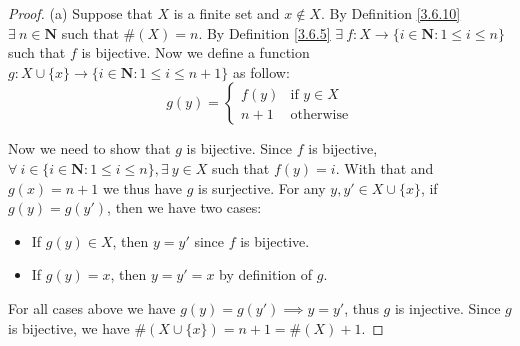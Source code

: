 \begin{proof}{(a)}
    Suppose that \(X\) is a finite set and \(x \notin X\).
    By Definition \ref{3.6.10} \(\exists\ n \in \mathbf{N}\) such that \(\#(X) = n\).
    By Definition \ref{3.6.5} \(\exists\ f : X \to \{i \in \mathbf{N} : 1 \leq i \leq n\}\) such that \(f\) is bijective.
    Now we define a function \(g : X \cup \{x\} \to \{i \in \mathbf{N} : 1 \leq i \leq n + 1\}\) as follow:
    \[
        g(y) = \begin{cases}
            f(y)  & \text{if } y \in X \\
            n + 1 & \text{otherwise}
        \end{cases}
    \]

    Now we need to show that \(g\) is bijective.
    Since \(f\) is bijective, \(\forall\ i \in \{i \in \mathbf{N} : 1 \leq i \leq n\}, \exists\ y \in X\) such that \(f(y) = i\).
    With that and \(g(x) = n + 1\) we thus have \(g\) is surjective.
    For any \(y, y' \in X \cup \{x\}\), if \(g(y) = g(y')\), then we have two cases:
    \begin{itemize}
        \item If \(g(y) \in X\), then \(y = y'\) since \(f\) is bijective.
        \item If \(g(y) = x\), then \(y = y' = x\) by definition of \(g\).
    \end{itemize}
    For all cases above we have \(g(y) = g(y') \implies y = y'\), thus \(g\) is injective.
    Since \(g\) is bijective, we have \(\#(X \cup \{x\}) = n + 1 = \#(X) + 1\).
\end{proof}

